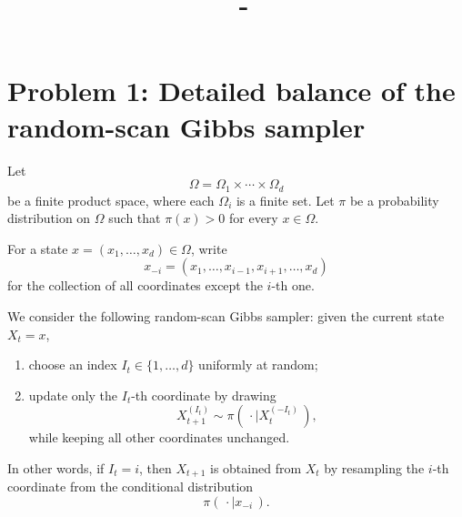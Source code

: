 \documentclass[answers,12pt,addpoints]{exam}
\author{\name}
\title{\course \ - \assignment}
\begin{document}
\maketitle

\section*{Problem 1: Detailed balance of the random-scan Gibbs sampler}

Let
\[
\Omega = \Omega_1 \times \cdots \times \Omega_d
\]
be a finite product space, where each $\Omega_i$ is a finite set. Let $\pi$ be a probability distribution on $\Omega$ such that $\pi(x) > 0$ for every $x \in \Omega$.

For a state $x = (x_1, \ldots, x_d) \in \Omega$, write
\[
x_{-i} = (x_1, \ldots, x_{i-1}, x_{i+1}, \ldots, x_d)
\]
for the collection of all coordinates except the $i$-th one.

We consider the following random-scan Gibbs sampler: given the current state $X_t = x$,
\begin{enumerate}
\item choose an index $I_t \in \{1, \ldots, d\}$ uniformly at random;
\item update only the $I_t$-th coordinate by drawing
\[
X^{(I_t)}_{t+1} \sim \pi(\,\cdot \mid X^{(-I_t)}_t\,),
\]
while keeping all other coordinates unchanged.
\end{enumerate}
In other words, if $I_t = i$, then $X_{t+1}$ is obtained from $X_t$ by resampling the $i$-th coordinate from the conditional distribution
\[
\pi(\,\cdot \mid x_{-i}\,).
\]
\end{document}
